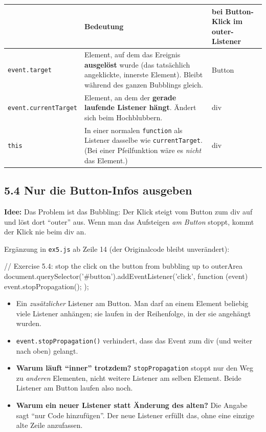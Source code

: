 \documentclass[a4paper,11pt]{article}
\begin{document}
\begin{center}
\begin{tabular}{@{}lL{7.2cm}L{3.2cm}@{}}
\toprule
 & Bedeutung & bei Button-Klick im outer-Listener\\
\midrule
\texttt{event.target} & Element, auf dem das Ereignis \textbf{ausgelöst} wurde (das tatsächlich angeklickte,
                        innerste Element). Bleibt während des ganzen Bubblings gleich. & Button\\
\texttt{event.currentTarget} & Element, an dem der \textbf{gerade laufende Listener hängt}. Ändert sich beim
                        Hochblubbern. & div\\
\texttt{this} & In einer normalen \texttt{function} als Listener dasselbe wie \texttt{currentTarget}. (Bei einer
                Pfeilfunktion wäre es \emph{nicht} das Element.) & div\\
\bottomrule
\end{tabular}
\end{center}

\subsection{5.4 Nur die Button-Infos ausgeben}

\textbf{Idee:} Das Problem ist das Bubbling: Der Klick steigt vom Button zum div auf und löst dort "`outer"' aus.
Wenn man das Aufsteigen \emph{am Button} stoppt, kommt der Klick nie beim div an.

Ergänzung in \texttt{ex5.js} ab Zeile 14 (der Originalcode bleibt unverändert):
\begin{code}[firstnumber=15]
// Exercise 5.4: stop the click on the button from bubbling up to outerArea
document.querySelector('#button').addEventListener('click', function (event) {
    event.stopPropagation();
});
\end{code}

\begin{itemize}
\item Ein \emph{zusätzlicher} Listener am Button. Man darf an einem Element beliebig viele Listener anhängen;
      sie laufen in der Reihenfolge, in der sie angehängt wurden.
\item \lstinline|event.stopPropagation()| verhindert, dass das Event zum div (und weiter nach oben) gelangt.
\item \textbf{Warum läuft "`inner"' trotzdem?} \texttt{stopPropagation} stoppt nur den Weg zu \emph{anderen}
      Elementen, nicht weitere Listener am selben Element. Beide Listener am Button laufen also noch.
\item \textbf{Warum ein neuer Listener statt Änderung des alten?} Die Angabe sagt "`nur Code hinzufügen"'. Der neue
      Listener erfüllt das, ohne eine einzige alte Zeile anzufassen.
\end{itemize}
\end{document}

